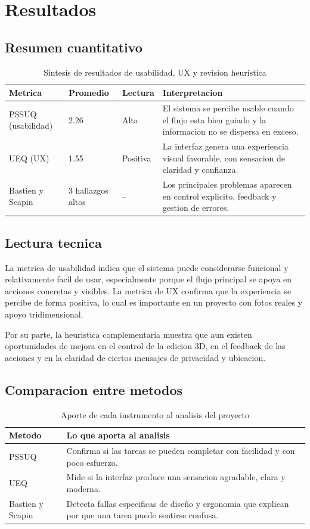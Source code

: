 \documentclass[12pt,a4paper]{article}
\begin{document}
\section{Resultados}
\subsection{Resumen cuantitativo}
\begin{table}[H]
\centering
\small
\begin{tabularx}{0.88\textwidth}{@{}p{4.2cm}p{2.3cm}p{2.2cm}Y@{}}
\toprule
\textbf{Metrica} & \textbf{Promedio} & \textbf{Lectura} & \textbf{Interpretacion} \\
\midrule
PSSUQ (usabilidad) & 2.26 & Alta & El sistema se percibe usable cuando el flujo esta bien guiado y la informacion no se dispersa en exceso. \\
UEQ (UX) & 1.55 & Positiva & La interfaz genera una experiencia visual favorable, con sensacion de claridad y confianza. \\
Bastien y Scapin & 3 hallazgos altos & -- & Los principales problemas aparecen en control explicito, feedback y gestion de errores. \\
\bottomrule
\end{tabularx}
\caption{Sintesis de resultados de usabilidad, UX y revision heuristica}
\end{table}

\subsection{Lectura tecnica}
La metrica de usabilidad indica que el sistema puede considerarse funcional y relativamente facil de usar, especialmente porque el flujo principal se apoya en acciones concretas y visibles. La metrica de UX confirma que la experiencia se percibe de forma positiva, lo cual es importante en un proyecto con fotos reales y apoyo tridimensional.

Por su parte, la heuristica complementaria muestra que aun existen oportunidades de mejora en el control de la edicion 3D, en el feedback de las acciones y en la claridad de ciertos mensajes de privacidad y ubicacion.

\subsection{Comparacion entre metodos}
\begin{table}[H]
\centering
\small
\begin{tabularx}{0.9\textwidth}{@{}p{3.4cm}Y@{}}
\toprule
\textbf{Metodo} & \textbf{Lo que aporta al analisis} \\
\midrule
PSSUQ & Confirma si las tareas se pueden completar con facilidad y con poco esfuerzo. \\
UEQ & Mide si la interfaz produce una sensacion agradable, clara y moderna. \\
Bastien y Scapin & Detecta fallas especificas de diseño y ergonomia que explican por que una tarea puede sentirse confusa. \\
\bottomrule
\end{tabularx}
\caption{Aporte de cada instrumento al analisis del proyecto}
\end{table}
\end{document}
